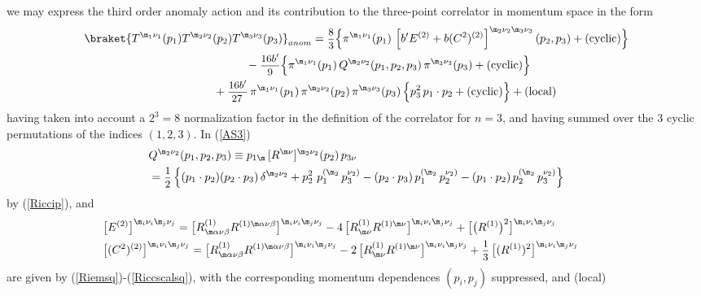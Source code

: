 \documentclass[a4paper,11pt,openright,twoside]{book}
\let\a=\alpha   \let\b=\beta   \let\g=\gamma   \let\d=\delta
\let\n=\nu      \let\x=\xi     \let\p=\pi      \let\r=\rho
\newcommand{\sdfrac}[2]{\mbox{\small$\displaystyle\frac{#1}{#2}$}}
\numberwithin{equation}{section}
\begin{document}
{{\begin{equation}
\label{Riccscalsq}
\end{equation}
we may express the third order anomaly action and its contribution to the 
three-point correlator in momentum space in the form
\begin{align}
&\braket{T^{\m_1\nu_1}(p_1)T^{\m_2\nu_2}(p_2)T^{\m_3\nu_3}(p_3)}_{anom}=\sdfrac{8}{3} \Big\{\pi^{\m_1\nu_1}(p_1)
\,\left[b'E^{(2)}+b(C^2)^{(2)}\right]^{\m_2\nu_2\m_3\nu_3}(p_2,p_3)+(\text{cyclic})\Big\}\notag\\
&\hspace{5cm} -\sdfrac{16b'}{9}\Big\{ \pi^{\m_1\nu_1}(p_1)\,Q^{\m_2\nu_2}(p_1,p_2,p_3)\, \pi^{\m_3\nu_3}(p_3)+(\text{cyclic})\Big\}\notag\\
&\hspace{4cm} +\sdfrac{16b'}{27\,}\, \pi^{\m_1\nu_1}(p_1)\,\pi^{\m_2\nu_2}(p_2)\,\pi^{\m_3\nu_3}(p_3)\,\Big\{p_3^2\, p_1\cdot p_2+(\text{cyclic})\Big\}
+ ({\rm local}) \label{AS3}
\end{align}
having taken into account a $2^3 = 8$ normalization factor in the definition of the correlator for $n=3$, and having summed over the $3$ cyclic permutations of the 
indices $(1,2,3)$. In (\ref{AS3})
\begin{align}
&Q^{\m_2\nu_2}(p_1,p_2,p_3) \equiv p_{1\m}\, [R^{\m\nu}]^{\m_2\nu_2}(p_2)\,p_{3\n} \notag\\
&= \sdfrac{1}{2} \,\Big\{(p_1\cdot p_2)(p_2\cdot p_3)\, \delta^{\m_2\n_2} 
+ p_2^2 \ p_1^{(\m_2}\, p_3^{\n_2)} - (p_2\cdot p_3) \, p_1^{(\m_2}\, p_2^{\n_2)} - (p_1\cdot p_2) \, p_2^{(\m_2}\, p_3^{\n_2)}\Big\}
\end{align}
by (\ref{Riccip}), and
\begin{subequations}
\begin{align}
	&\hspace{-1cm}\big[E^{(2)}\big]^{\m_i\nu_i\m_j\nu_j} =\big[R_{\m\a\n\b}^{(1)}R^{(1)\m\a \n\b}\big]^{\m_i\nu_i\m_j\nu_j}
	-4\,\big[R_{\m\n}^{(1)}R^{(1)\m\n}\big]^{\m_i\nu_i\m_j\nu_j}
	+\big[ \big(R^{(1)}\big)^2\big]^{\m_i\nu_i\m_j\nu_j}\\
	&\hspace{-1cm} \big[(C^2)^{(2)}\big]^{\m_i\nu_i\m_j\nu_j}= \big[R_{\m\a\n\b}^{(1)}R^{(1)\m\a \n\b}\big]^{\m_i\nu_i\m_j\nu_j}
	-2\,\big[R_{\m\n}^{(1)}R^{(1)\m\n}\big]^{\m_i\nu_i\m_j\nu_j}
	+ \sdfrac{1}{3}\,\big[(R^{(1)})^2\big]^{\m_i\nu_i\m_j\nu_j}
\end{align}
\end{subequations}
are given by (\ref{Riemsq})-(\ref{Riccscalsq}), with the corresponding momentum dependences $(p_i, p_j)$ suppressed, and (local)
}}
\end{document}
